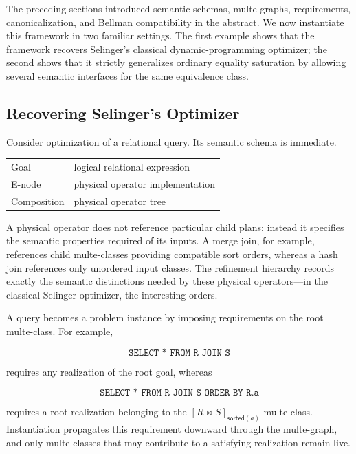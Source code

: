 \documentclass[sigconf,nonacm]{acmart}
\theoremstyle{definition}
\theoremstyle{plain}
\theoremstyle{remark}
\begin{document}
The preceding sections introduced semantic schemas, multe-graphs,
requirements, canonicalization, and Bellman compatibility in the
abstract.  We now instantiate this framework in two familiar settings.
The first example shows that the framework recovers Selinger's
classical dynamic-programming optimizer; the second shows that it
strictly generalizes ordinary equality saturation by allowing several
semantic interfaces for the same equivalence class.

\subsection{Recovering Selinger's Optimizer}
\label{sec:selinger-example}

Consider optimization of a relational query.  Its semantic schema is
immediate.

\begin{center}
\begin{tabular}{ll}
Goal & logical relational expression \\
E-node & physical operator implementation \\
Composition & physical operator tree \\
\end{tabular}
\end{center}

A physical operator does not reference particular child plans; instead
it specifies the semantic properties required of its inputs.  A merge
join, for example, references child multe-classes providing compatible
sort orders, whereas a hash join references only unordered input
classes.  The refinement hierarchy records exactly the semantic
distinctions needed by these physical operators---in the classical
Selinger optimizer, the interesting orders.

A query becomes a problem instance by imposing requirements on the
root multe-class.
For example,

\[
\texttt{SELECT * FROM R JOIN S}
\]

requires any realization of the root goal, whereas

\[
\texttt{SELECT * FROM R JOIN S ORDER BY R.a}
\]

requires a root realization belonging to the
\([R\Join S]_{\mathsf{sorted}(a)}\)
multe-class.  Instantiation propagates this requirement downward
through the multe-graph, and only multe-classes that may contribute to
a satisfying realization remain live.
\end{document}
